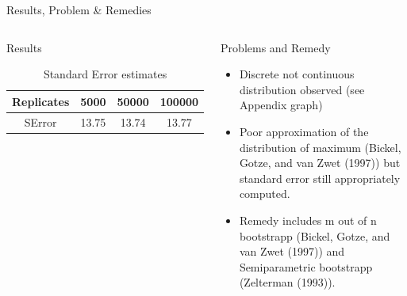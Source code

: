 \documentclass[a4paper,9pt]{beamer}\usepackage[]{graphicx}\usepackage[]{color}
\begin{document}
\begin{frame}{Results, Problem \& Remedies}


\begin{columns}
\begin{block}{Results}
\begin{table}[h]
\begin{tabular}{cccc}
\hline
Replicates & 5000 & 50000 & 100000\\ 
\hline
SError & 13.75 & 13.74 & 13.77\\
\hline
\end{tabular}
\caption{Standard Error estimates}
\end{table}
\end{block}
\begin{block}{Problems and Remedy}
\begin{itemize}
\item Discrete not continuous distribution observed (\alert{see Appendix graph})
\item Poor approximation of the distribution of maximum (\alert{Bickel, Gotze, and van Zwet (1997)}) but standard error still appropriately computed.
\item Remedy includes m out of n bootstrapp (\alert{Bickel, Gotze, and van Zwet (1997)}) and Semiparametric bootstrapp (\alert{Zelterman (1993)}).
\end{itemize}
\end{block}
\end{columns}
\end{frame}
\end{document}
